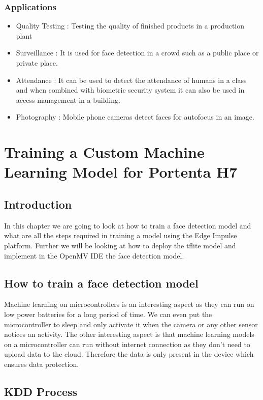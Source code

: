 \subsection{Applications}
\begin{itemize}
	\item Quality Testing : Testing the quality of finished products in a production plant
	\item Surveillance : It is used for face detection in a crowd such as a public place or private place.
	\item Attendance : It can be used to detect the attendance of humans in a class and when combined with biometric security system it can also be used in access management in a building.
	\item Photography : Mobile phone cameras detect faces for autofocus in an image.
\end{itemize}
\chapter{Training a Custom Machine Learning Model for Portenta H7}

\section{Introduction}
In this chapter we are going to look at how to train a face detection model and what are all the steps required in training a model using the Edge Impulse platform. Further we will be looking at how to deploy the tflite model and implement in the OpenMV IDE the face detection model.

\section{How to train a face detection model }
Machine learning on microcontrollers is an interesting aspect as they can run on low power batteries for a long period of time. We can even put the microcontroller to sleep and only activate it when the camera or any other sensor notices an activity. The other interesting aspect is that machine learning models on a microcontroller can run without internet connection as they don't need to upload data to the cloud. Therefore the data is only present in the device which ensures data protection.\cite{Romero:2020}

\section{KDD Process}

